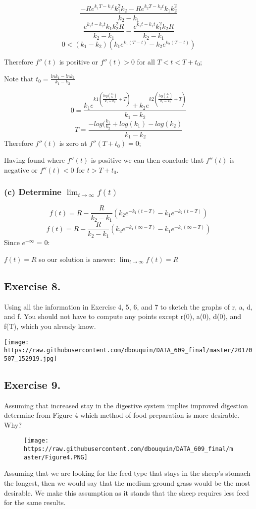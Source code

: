 \documentclass[]{article}
\begin{document}
\[\frac{-R e ^{k_1 T - k_1 t}k_1^2 k_2 - R e^{k_2T -k_2t}k_1 k_2^2}{k_2 - k_1}\]
\[\frac{ e^{k_2 t - k_2 t}k_1 k_2^2 R}{k_2 - k_1} - \frac{ e^{k_1 t - k_1 t}k_1^2 k_2 R}{k_2 - k_1}\]
\[0 < (k_1 - k_2)(k_1 e^{k_1(T-t)}- k_2 e^{k_2(T-t)})\]

Therefore \(f''(t)\) is positive or \(f''(t) > 0\) for all
\(T < t < T + t_0\);

Note that \(t_0 = \frac{ln k_1 - ln k_2}{k_1 - k_2}\)

\[0 = \frac{k_1 e^{k1(\frac{log(\frac{k_2}{k_1})}{k_1 - k_2}+T)} + k_2 e^{k2(\frac{log(\frac{k_2}{k_1})}{k_1 - k_2}+T)} }{k_1 - k_2}\]
\[T = \frac{-log(\frac{k_1}{k_2}+log(k_1)- log(k_2)}{k_1 - k_2}\]
Therefore \(f''(t)\) is zero at \(f''(T + t_0) =0\);

Having found where \(f''(t)\) is positive we can then conclude that
\(f''(t)\) is negative or \(f''(t) < 0\) for \(t > T + t_0\).

\subsubsection{\texorpdfstring{(c) Determine
\(\lim_{t\to\infty}f(t)\)}{(c) Determine \textbackslash{}lim\_\{t\textbackslash{}to\textbackslash{}infty\}f(t)}}\label{c-determine-lim_ttoinftyft}

\[f(t) = R - \frac{R}{k_2 - k_1}(k_2 e^{-k_1(t-T)}-k_1 e^{-k_2(t-T)})\]
\[f(t) = R - \frac{R}{k_2 - k_1}(k_2 e^{-k_1(\infty-T)}-k_1 e^{-k_2(\infty-T)})\]
Since \(e^{-\infty}\) = 0:

\(f(t) = R\) so our solution is answer: \(\lim_{t\to\infty}f(t) = R\)

\subsection{Exercise 8.}\label{exercise-8.}

Using all the information in Exercise 4, 5, 6, and 7 to sketch the
graphs of r, a, d, and f. You should not have to compute any points
except r(0), a(0), d(0), and f(T), which you already know.

\texttt{[image: https://raw.githubusercontent.com/dbouquin/DATA\_609\_final/master/20170507\_152919.jpg]}
\newpage

\subsection{Exercise 9.}\label{exercise-9.}

Assuming that increased stay in the digestive system implies improved
digestion determine from Figure 4 which method of food preparation is
more desirable. Why?

\begin{figure}[htbp]
\centering
\texttt{[image: https://raw.githubusercontent.com/dbouquin/DATA\_609\_final/master/Figure4.PNG]}
\caption{}
\end{figure}

Assuming that we are looking for the feed type that stays in the sheep's
stomach the longest, then we would say that the medium-ground grass
would be the most desirable. We make this assumption as it stands that
the sheep requires less feed for the same results.
\end{document}
